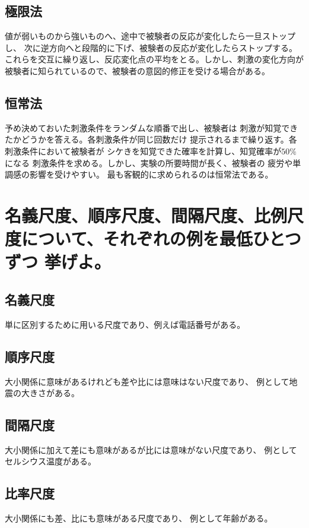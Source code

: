 \documentclass[twocolumn, 10pt,a4j]{jsarticle}
\begin{document}
  \subsection{極限法}
    値が弱いものから強いものへ、途中で被験者の反応が変化したら一旦ストップし、
    次に逆方向へと段階的に下げ、被験者の反応が変化したらストップする。
    これらを交互に繰り返し、反応変化点の平均をとる。しかし、刺激の変化方向が
    被験者に知られているので、被験者の意図的修正を受ける場合がある。
  \subsection{恒常法}
    予め決めておいた刺激条件をランダムな順番で出し、被験者は
    刺激が知覚できたかどうかを答える。各刺激条件が同じ回数だけ
    提示されるまで繰り返す。各刺激条件において被験者が
    シケきを知覚できた確率を計算し、知覚確率が$50\%$になる
    刺激条件を求める。しかし、実験の所要時間が長く、被験者の
    疲労や単調感の影響を受けやすい。
  最も客観的に求められるのは恒常法である。
    
\section{名義尺度、順序尺度、間隔尺度、比例尺度について、それぞれの例を最低ひとつずつ
挙げよ。}
  \subsection{名義尺度}
    単に区別するために用いる尺度であり、例えば電話番号がある。
  \subsection{順序尺度}
    大小関係に意味があるけれども差や比には意味はない尺度であり、
    例として地震の大きさがある。
  \subsection{間隔尺度}
    大小関係に加えて差にも意味があるが比には意味がない尺度であり、
    例としてセルシウス温度がある。
  \subsection{比率尺度}
    大小関係にも差、比にも意味がある尺度であり、
    例として年齢がある。
\end{document}
